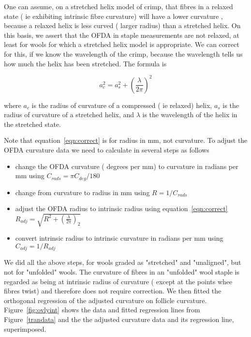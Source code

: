\documentclass[titlepage]{article}  %
\begin{document}


One can assume, on a stretched helix model of crimp, that fibres in a relaxed state ( ie exhibiting intrinsic fibre curvature) will have a lower curvature , because a relaxed helix is less curved ( larger radius) than a stretched helix. On this basis, we assert that the OFDA in staple measurements are not relaxed, at least for wools for which a stretched helix model is appropriate. We can correct for this, if we know the wavelength of the crimp, because the wavelength tells us how much the helix has been stretched. The formula is

\begin{equation}
\label{eqn:correct}
a_{c}^{2} = a_{s}^{2} + \left(\frac{\lambda}{2 \pi}\right)^{2}
\end{equation}

where $a_{c}$ is the radius of curvature of a compressed ( ie relaxed) helix, $a_{s}$ is the radius of curvature of a stretched helix, and $\lambda$ is the wavelength of the helix in the stretched state. 

Note that equation~\ref{eqn:correct} is for radius in mm, not curvature. To adjust the OFDA curvature data we need to calculate in several steps as follows
\begin{itemize}
\item change the OFDA curvature ( degrees per mm) to curvature in radians per mm using $C_{rads} = \pi C_{deg} / 180$
\item change from curvature to radius in mm using $R = 1/C_{rads}$
\item adjust the OFDA radius to intrinsic radius using equation~\ref{eqn:correct} $R_{adj} = \sqrt{R^{2} + \left(\frac{\lambda}{2 \pi}\right)_{2}}$
\item convert intrinsic radius to intrinsic curvature in radians per mm using $C_{adj} = 1 / R_{adj}$
\end{itemize}

We did all the above steps, for wools graded as "stretched" and "unaligned", but not for "unfolded" wools. The curvature of fibres in an "unfolded" wool staple is regarded as being at intrinsic radius of curvature ( except at the points whee fibres twist) and therefore does not require correction. We then fitted the orthogonal regression of the adjusted curvature on follicle curvature. Figure~\ref{fig:ovlyint} shows the data and fitted regression lines from Figure~\ref{trandata} and the the adjusted curvature data and its regression line, superimposed. 
\end{document}
